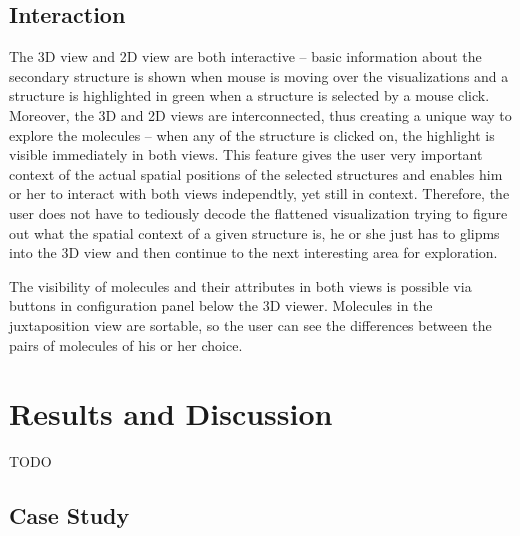 \documentclass[twocolumn]{bmcart}%
\begin{document}
\subsection*{Interaction}



The 3D view and 2D view are both interactive -- basic information about the secondary structure is shown when mouse is moving over the visualizations and a structure is highlighted in green when a structure is selected by a mouse click. Moreover, the 3D and 2D views are interconnected, thus creating a unique way to explore the molecules -- when any of the structure is clicked on, the highlight is visible immediately in both views. This feature gives the user very important context of the actual spatial positions of the selected structures and enables him or her to interact with both views independtly, yet still in context. Therefore, the user does not have to tediously decode the flattened visualization trying to figure out what the spatial context of a given structure is, he or she just has to glipms into the 3D view and then continue to the next interesting area for exploration.

The visibility of molecules and their attributes in both views is possible via buttons in configuration panel below the 3D viewer. Molecules in the juxtaposition view are sortable, so the user can see the differences between the pairs of molecules of his or her choice.



\section*{Results and Discussion}
TODO

\subsection*{Case Study}
\end{document}
